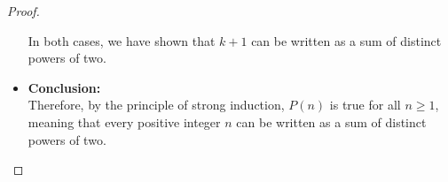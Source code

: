 \documentclass[12pt]{article}
\begin{document}
\begin{proof}
\begin{itemize}
\begin{itemize}
    \end{itemize}
    
    In both cases, we have shown that $k + 1$ can be written as a sum of distinct powers of two.

    \item \textbf{Conclusion:} \\
    Therefore, by the principle of strong induction, $P(n)$ is true for all $n \geq 1$, meaning that every positive integer $n$ can be written as a sum of distinct powers of two.
    
    \end{itemize}
    
\end{proof}
\end{document}
